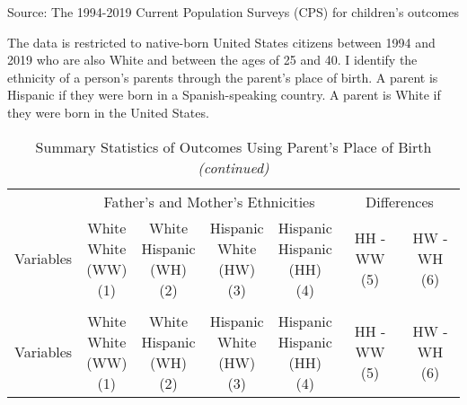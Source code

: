 
\begin{landscape}
\begin{ThreePartTable}
\begin{TableNotes}
\item[1] Source: The 1994-2019 Current Population Surveys (CPS) for children's outcomes
\item[2] The data is restricted to native-born United States citizens between 1994 and 2019 who are also White and between the ages of 25 and 40. I identify the ethnicity of a person's parents through the parent's place of birth. A parent is Hispanic if they were born in a Spanish-speaking country. A parent is White if they were born in the United States.
\end{TableNotes}
\begin{longtable}[t]{>{\raggedright\arraybackslash}p{5cm}cccccc}
\caption{Summary Statistics of Outcomes Using Parent's Place of Birth \label{tab:c&p2}}\\
\toprule
\multicolumn{1}{c}{ } & \multicolumn{4}{c}{Father's and Mother's Ethnicities} & \multicolumn{2}{c}{Differences} \\
\cmidrule(l{3pt}r{3pt}){2-5} \cmidrule(l{3pt}r{3pt}){6-7}
Variables & \specialcell{White \\ White \\ (WW) \\ (1)} & \specialcell{White \\ Hispanic \\ (WH) \\ (2)} & \specialcell{Hispanic \\ White \\ (HW) \\ (3)} & \specialcell{Hispanic \\ Hispanic \\ (HH) \\ (4)} & \specialcell{HH - WW \\ (5)} & \specialcell{HW - WH \\ (6)}\\
\midrule
\endfirsthead
\caption[]{Summary Statistics of Outcomes Using Parent's Place of Birth  \textit{(continued)}}\\
\toprule
Variables & \specialcell{White \\ White \\ (WW) \\ (1)} & \specialcell{White \\ Hispanic \\ (WH) \\ (2)} & \specialcell{Hispanic \\ White \\ (HW) \\ (3)} & \specialcell{Hispanic \\ Hispanic \\ (HH) \\ (4)} & \specialcell{HH - WW \\ (5)} & \specialcell{HW - WH \\ (6)}\\

\end{longtable}
\end{ThreePartTable}
\end{landscape}
